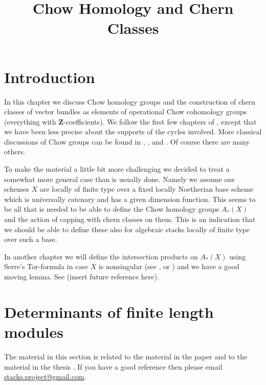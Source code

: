 

%


\title{Chow Homology and Chern Classes}

\maketitle

\label{section-phantom}


\tableofcontents


\section{Introduction}
\label{section-introduction}

\noindent
In this chapter we discuss Chow homology groups and the construction
of chern classes of vector bundles as elements of operational
Chow cohomology groups (everything with $\mathbf{Z}$-coefficients).
We follow the first few chapters of \cite{F}, except that we have been
less precise about the supports of the cycles involved.
More classical discussions of Chow groups can be found in
\cite{Samuel}, \cite{ChevalleyI}, and \cite{ChevalleyII}.
Of course there are many others.

\medskip\noindent
To make the material a little bit more challenging we decided
to treat a somewhat more general case than is usually done.
Namely we assume our schemes $X$ are locally of finite type
over a fixed locally Noetherian base scheme which is universally
catenary and has a given dimension function. This seems to be
all that is needed to be able to define the Chow homology
groups $A_*(X)$ and the action of capping with chern classes
on them. This is an indication that we should be able to define
these also for algebraic stacks locally of finite type over such
a base.

\medskip\noindent
In another chapter we will define the intersection products
on $A_*(X)$ using Serre's Tor-formula in case $X$ is nonsingular
(see \cite{Serre_local_algebra}, or \cite{Serre_algebre_locale})
and we have a good moving lemma. See (insert future reference here).

\section{Determinants of finite length modules}
\label{section-determinants-finite-length}

\noindent
The material in this section is related to the material in
the paper \cite{determinant} and to the material in the
thesis \cite{Joe}. If you have a good reference then please
email \href{mailto:stacks.project@gmail.com}{stacks.project@gmail.com}.

